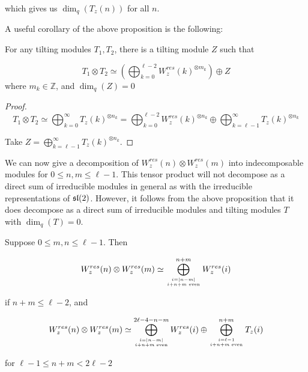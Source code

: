 which gives us $\dim_q(T_z(n))$ for all $n$.

A useful corollary of the above proposition is the following:

\begin{corollary}
\label{theorem:tensortilting}
    For any tilting modules $T_1, T_2$, there is a tilting module $Z$ such that 

    \begin{equation}
            T_1 \otimes T_2 \simeq \left(\bigoplus_{k=0}^{\ell - 2} W_z^{res}(k)^{\otimes m_k}\right) \oplus Z
    \end{equation}
    where $m_k \in \mathbb{Z}$, and $\dim_q(Z) = 0$
\end{corollary}
\begin{proof}
\begin{equation}
    T_1 \otimes T_2 \simeq \bigoplus_{k=0}^{\infty} T_z(k)^{\otimes n_k} =
    \bigoplus_{k=0}^{\ell-2} W_z^{res}(k)^{\otimes n_k} \oplus
    \bigoplus_{k=\ell-1}^{\infty} T_z(k)^{\otimes n_k}
\end{equation}

Take $Z = \displaystyle\bigoplus_{k=\ell-1}^{\infty} T_z(k)^{\otimes n_k}$.
\end{proof}

We can now give a decomposition of $W_z^{res}(n) \otimes W_z^{res}(m)$ into
indecomposable modules for $0 \leq n,m \leq \ell-1$.  This tensor product will
not decompose as a direct sum of irreducible modules in general as with the
irreducible representations of $\mathfrak{sl}(2)$. However, it follows from the above
proposition that it does decompose as a direct sum of irreducible modules and
tilting modules $T$ with $\dim_q(T) = 0$.

\begin{prop}
\label{theorem:decomposition}
Suppose $0 \leq m,n \leq \ell - 1$. Then

\begin{equation}
W_z^{res}(n) \otimes W_{z}^{res}(m) \simeq \bigoplus_{i=|n-m| \atop i + n + m \text{ even}}^{n+m} W_z^{res}(i) 
\end{equation}

if $n+m \leq \ell - 2$, and 

\begin{equation}
W_z^{res}(n) \otimes W_{z}^{res}(m) \simeq \bigoplus_{i=|n-m| \atop i + n + m \text{ even}}^{2\ell - 4 - n - m} W_z^{res}(i) 
                                    \oplus \bigoplus_{i = \ell - 1 \atop i + n + m \text{ even}} ^{n + m} T_z(i)
\end{equation}

for $\ell - 1 \leq n + m < 2\ell - 2$
\end{prop}


